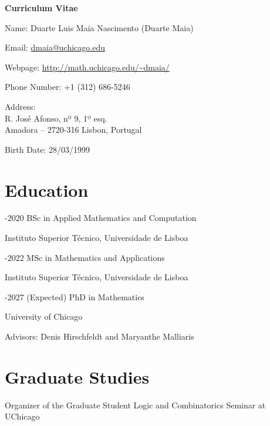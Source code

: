 \documentclass[11pt]{article} %
\begin{document}

{\LARGE\bfseries Curriculum Vitae} %
\bigskip %

Name: Duarte Luis Maia Nascimento (Duarte Maia)
\smallskip

Email: \href{mailto:dmaia@uchicago.edu}{dmaia@uchicago.edu} %
\smallskip

Webpage: \url{http://math.uchicago.edu/~dmaia/}

\smallskip

Phone Number: +1 (312) 686-5246 %
\smallskip


Address:\\
R. José Afonso, nº 9, 1º esq.\\ %
Amadora -- 2720-316
Lisbon, Portugal
\smallskip

Birth Date: 28/03/1999 %



\section*{Education}

-2020 BSc in Applied Mathematics and Computation
\smallskip

Instituto Superior Técnico, Universidade de Lisboa

\medskip

-2022 MSc in Mathematics and Applications
\smallskip

Instituto Superior Técnico, Universidade de Lisboa

\medskip

-2027 (Expected) PhD in Mathematics
\smallskip

University of Chicago

Advisors: Denis Hirschfeldt and Maryanthe Malliaris

\section*{Graduate Studies}

 \entry Organizer of the Graduate Student Logic and Combinatorics Seminar at UChicago
\end{document}
